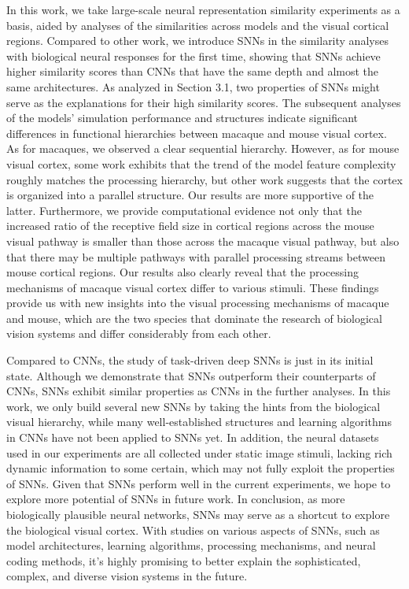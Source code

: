 \documentclass[letterpaper]{article} %
\begin{document}
In this work, we take large-scale neural representation similarity experiments as a basis, aided by analyses of the similarities across models and the visual cortical regions. Compared to other work, we introduce SNNs in the similarity analyses with biological neural responses for the first time, showing that SNNs achieve higher similarity scores than CNNs that have the same depth and almost the same architectures. As analyzed in Section 3.1, two properties of SNNs might serve as the explanations for their high similarity scores.  The subsequent analyses of the models' simulation performance and structures indicate significant differences in functional hierarchies between macaque and mouse visual cortex. As for macaques, we observed a clear sequential hierarchy. However, as for mouse visual cortex, some work \cite{conwell2021neural} exhibits that the trend of the model feature complexity roughly matches the processing hierarchy, but other work suggests that the cortex \cite{shi2019comparison, nayebi2022mouse} is organized into a parallel structure. Our results are more supportive of the latter. Furthermore, we provide computational evidence not only that the increased ratio of the receptive field size in cortical regions across the mouse visual pathway is smaller than those across the macaque visual pathway, but also that there may be multiple pathways with parallel processing streams between mouse cortical regions. Our results also clearly reveal that the processing mechanisms of macaque visual cortex differ to various stimuli. These findings provide us with new insights into the visual processing mechanisms of macaque and mouse, which are the two species that dominate the research of biological vision systems and differ considerably from each other.

Compared to CNNs, the study of task-driven deep SNNs is just in its initial state. Although we demonstrate that SNNs outperform their counterparts of CNNs, SNNs exhibit similar properties as CNNs in the further analyses. In this work, we only build several new SNNs by taking the hints from the biological visual hierarchy, while many well-established structures and learning algorithms in CNNs have not been applied to SNNs yet. In addition, the neural datasets used in our experiments are all collected under static image stimuli, lacking rich dynamic information to some certain, which may not fully exploit the properties of SNNs. Given that SNNs perform well in the current experiments, we hope to explore more potential of SNNs in future work.  In conclusion, as more biologically plausible neural networks, SNNs may serve as a shortcut to explore the biological visual cortex. With studies on various aspects of SNNs, such as model architectures, learning algorithms, processing mechanisms, and neural coding methods, it's highly promising to better explain the sophisticated, complex, and diverse vision systems in the future.
\end{document}
